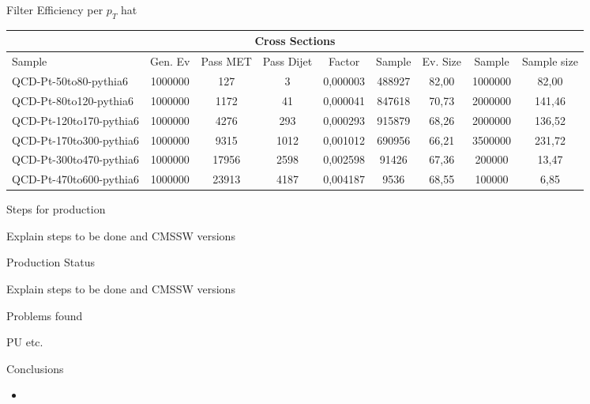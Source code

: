 \documentclass[8pt]{beamer}
\begin{document}
\begin{frame}{Filter Efficiency per $p_T$ hat}
 
\begin{tabular}{|l||c|c|c|c|c|c|c|c|}
\hline
\multicolumn{9}{|c|}{Cross Sections} \\
\hline \hline
                 Sample & Gen. Ev & Pass MET & Pass Dijet &   Factor & Sample & Ev. Size &  Sample & Sample size \\
\hline \hline
QCD-Pt-50to80-pythia6   & 1000000 &      127 &          3 & 0,000003 & 488927 &    82,00 & 1000000 &  82,00 \\
QCD-Pt-80to120-pythia6  & 1000000 &     1172 &         41 & 0,000041 & 847618 &    70,73 & 2000000 & 141,46 \\
QCD-Pt-120to170-pythia6 & 1000000 &     4276 &        293 & 0,000293 & 915879 &    68,26 & 2000000 & 136,52 \\
QCD-Pt-170to300-pythia6 & 1000000 &     9315 &       1012 & 0,001012 & 690956 &    66,21 & 3500000 & 231,72 \\
QCD-Pt-300to470-pythia6 & 1000000 &    17956 &       2598 & 0,002598 &  91426 &    67,36 &  200000 &  13,47 \\
QCD-Pt-470to600-pythia6 & 1000000 &    23913 &       4187 & 0,004187 &   9536 &    68,55 &  100000 &   6,85 \\
\hline
\end{tabular}
 
\end{frame}

\begin{frame}{Steps for production}
 
Explain steps to be done and CMSSW versions
 
\end{frame}

\begin{frame}{Production Status}
 
Explain steps to be done and CMSSW versions
 
\end{frame}

\begin{frame}{Problems found}
 
PU etc.
 
\end{frame}

\begin{frame}{Conclusions}

\begin{block}

\begin{itemize}
  \item 
\end{itemize} 

\end{block}

\end{frame}
\end{document}
